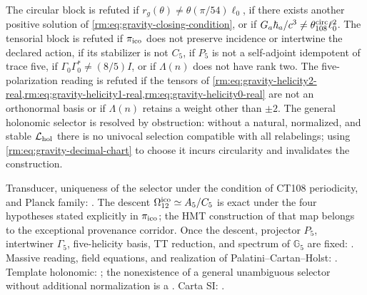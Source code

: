 \begin{falsifier}
The circular block is refuted if
\(r_g(\theta)\neq\theta(\pi/54)\ell_0\), if there exists another positive solution
of \cref{rm:eq:gravity-closing-condition}, or if
\(G_a\hbar_a/c^3\neq\theta_{108}^{\rm circ}\ell_0^2\). The tensorial block is
refuted if \(\pi_{\rm ico}\) does not preserve incidence or intertwine the
declared action, if its stabilizer is not \(C_5\), if \(P_5\) is not a
self-adjoint idempotent of trace five, if
\(\Gamma_0\Gamma_0^*\neq(8/5)I\), or if \(\Lambda(n)\) does not have rank two.
The five-polarization reading is refuted if the tensors of
\cref{rm:eq:gravity-helicity2-real,rm:eq:gravity-helicity1-real,rm:eq:gravity-helicity0-real}
are not an orthonormal basis or if \(\Lambda(n)\) retains a weight other than
\(\pm2\).
The general holonomic selector is resolved by obstruction: without a
natural, normalized, and stable \(\mathcal L_{\rm hol}\) there is no
univocal selection compatible with all relabelings; using
\cref{rm:eq:gravity-decimal-chart} to choose it incurs circularity and
invalidates the construction.
\end{falsifier}

\begin{statusbox}
Transducer, uniqueness of the selector under the condition of
CT108 periodicity, and Planck family: .
The descent \(\Omega_{12}^{\rm ico}\simeq A_5/C_5\) is exact under the four hypotheses stated explicitly in \(\pi_{\rm ico}\); the HMT construction of that map belongs to the exceptional provenance corridor. Once the descent, projector \(P_5\), intertwiner \(\Gamma_5\), five-helicity basis, TT reduction, and spectrum of \(\mathbb G_5\) are fixed: .
Massive reading, field equations, and realization
of Palatini--Cartan--Holst: . Template
holonomic: ; the nonexistence of a general unambiguous selector without additional normalization is a
. Carta SI:
.
\end{statusbox}
